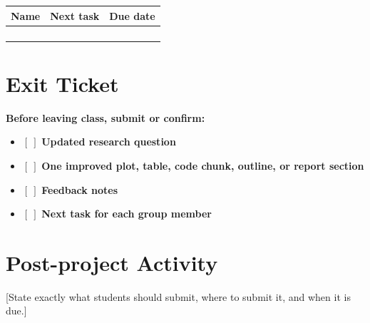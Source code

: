 \documentclass[11pt]{article}
\newcommand{\badge}[1]{$[\ ]$ \textbf{#1}}
\begin{document}
\begin{center}
\begin{tabular}{|p{}|p{}|p{}|}
\hline
\textbf{Name} & \textbf{Next task} & \textbf{Due date}\\
\hline
 & & \\[22pt]
\hline
 & & \\[22pt]
\hline
 & & \\[22pt]
\hline
 & & \\[22pt]
\hline
\end{tabular}
\end{center}

\section*{Exit Ticket}

\textbf{Before leaving class, submit or confirm:}
\begin{itemize}
  \item \badge{Updated research question}
  \item \badge{One improved plot, table, code chunk, outline, or report section}
  \item \badge{Feedback notes}
  \item \badge{Next task for each group member}
\end{itemize}

\section*{Post-project Activity}

[State exactly what students should submit, where to submit it, and when it is due.]
\end{document}
